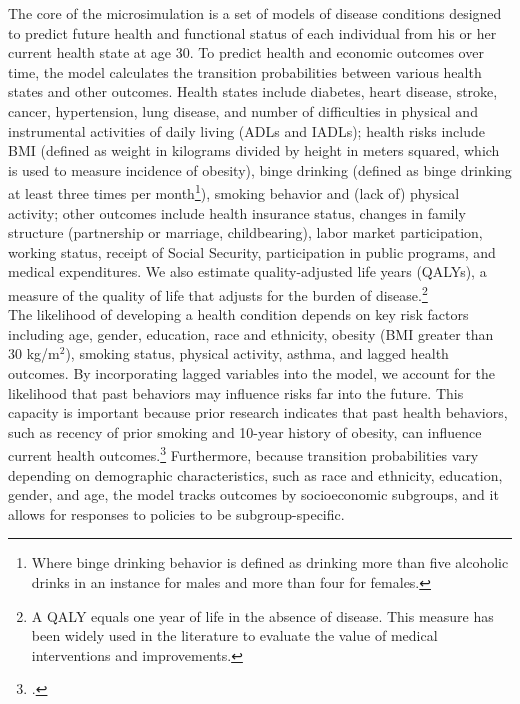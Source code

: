 \noindent The core of the microsimulation is a set of models of disease conditions designed to predict future health and functional status of each individual from his or her current health state at age 30. To predict health and economic outcomes over time, the model calculates the transition probabilities between various health states and other outcomes. Health states include diabetes, heart disease, stroke, cancer, hypertension, lung disease, and number of difficulties in physical and instrumental activities of daily living (ADLs and IADLs); health risks include BMI (defined as weight in kilograms divided by height in meters squared, which is used to measure incidence of obesity), binge drinking (defined as binge drinking at least three times per month\footnote{Where binge drinking behavior is defined as drinking more than five alcoholic drinks in an instance for males and more than four for females.}), smoking behavior and (lack of) physical activity; other outcomes include health insurance status, changes in family structure (partnership or marriage, childbearing), labor market participation, working status, receipt of Social Security, participation in public programs, and medical expenditures. We also estimate quality-adjusted life years (QALYs), a measure of the quality of life that adjusts for the burden of disease.\footnote{A QALY equals one year of life in the absence of disease. This measure has been widely used in the literature to evaluate the value of medical interventions and improvements.} \\

\noindent The likelihood of developing a health condition depends on key risk factors including age, gender, education, race and ethnicity, obesity (BMI greater than 30 kg/m$^2$), smoking status, physical activity, asthma, and lagged health outcomes. By incorporating lagged variables into the model, we account for the likelihood that past behaviors may influence risks far into the future. This capacity is important because prior research indicates that past health behaviors, such as recency of prior smoking and 10-year history of obesity, can influence current health outcomes.\footnote{\citet{Tong_etal_1996-Lung-Carcinoma,Moore_etal_2008_Past-Body-Mass}.} Furthermore, because transition probabilities vary depending on demographic characteristics, such as race and ethnicity, education, gender, and age, the model tracks outcomes by socioeconomic subgroups, and it allows for responses to policies to be subgroup-specific. \\

